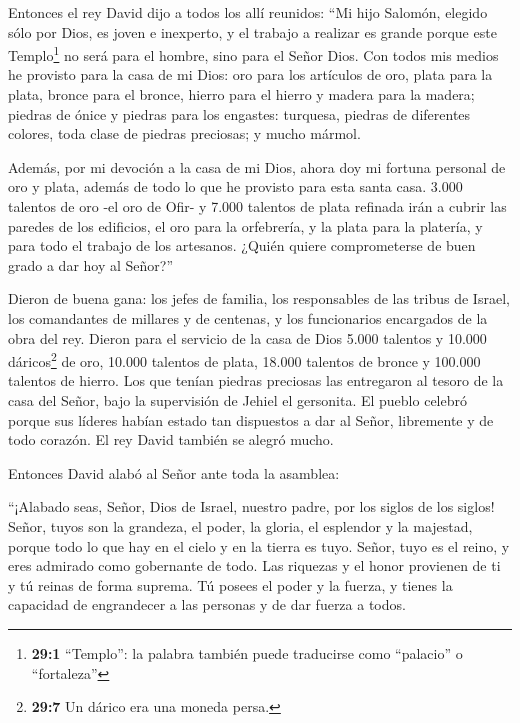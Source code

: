  Entonces el rey David dijo a todos los allí reunidos: ``Mi
hijo Salomón, elegido sólo por Dios, es joven e inexperto, y el trabajo
a realizar es grande porque este Templo\footnote{\textbf{29:1}
  ``Templo'': la palabra también puede traducirse como ``palacio'' o
  ``fortaleza''} no será para el hombre, sino para el Señor Dios.
 Con todos mis medios he provisto para la casa de mi Dios:
oro para los artículos de oro, plata para la plata, bronce para el
bronce, hierro para el hierro y madera para la madera; piedras de ónice
y piedras para los engastes: turquesa, piedras de diferentes colores,
toda clase de piedras preciosas; y mucho mármol.

 Además, por mi devoción a la casa de mi Dios, ahora doy mi
fortuna personal de oro y plata, además de todo lo que he provisto para
esta santa casa.  3.000 talentos de oro -el oro de Ofir- y
7.000 talentos de plata refinada irán a cubrir las paredes de los
edificios,  el oro para la orfebrería, y la plata para la
platería, y para todo el trabajo de los artesanos. ¿Quién quiere
comprometerse de buen grado a dar hoy al Señor?''

 Dieron de buena gana: los jefes de familia, los
responsables de las tribus de Israel, los comandantes de millares y de
centenas, y los funcionarios encargados de la obra del rey. 
Dieron para el servicio de la casa de Dios 5.000 talentos y 10.000
dáricos\footnote{\textbf{29:7} Un dárico era una moneda persa.} de oro,
10.000 talentos de plata, 18.000 talentos de bronce y 100.000 talentos
de hierro.  Los que tenían piedras preciosas las entregaron
al tesoro de la casa del Señor, bajo la supervisión de Jehiel el
gersonita.  El pueblo celebró porque sus líderes habían
estado tan dispuestos a dar al Señor, libremente y de todo corazón. El
rey David también se alegró mucho.

 Entonces David alabó al Señor ante toda la asamblea:

``¡Alabado seas, Señor, Dios de Israel, nuestro padre, por los siglos de
los siglos!  Señor, tuyos son la grandeza, el poder, la
gloria, el esplendor y la majestad, porque todo lo que hay en el cielo y
en la tierra es tuyo. Señor, tuyo es el reino, y eres admirado como
gobernante de todo.  Las riquezas y el honor provienen de
ti y tú reinas de forma suprema. Tú posees el poder y la fuerza, y
tienes la capacidad de engrandecer a las personas y de dar fuerza a
todos.


